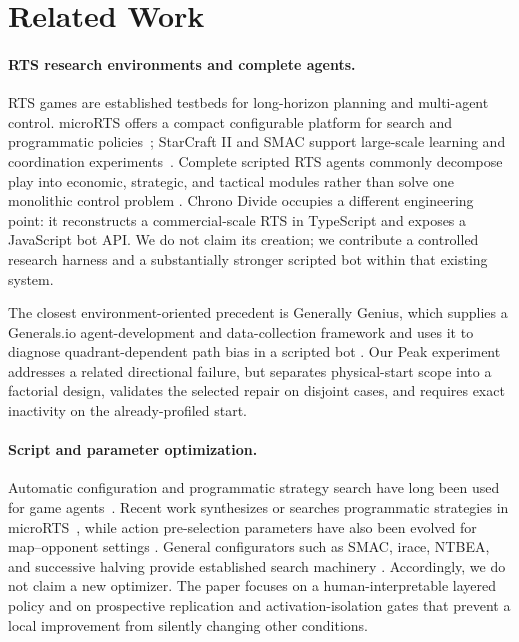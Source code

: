 \section{Related Work}
\label{sec:related}

\paragraph{RTS research environments and complete agents.}
RTS games are established testbeds for long-horizon planning and multi-agent
control. microRTS offers a compact configurable platform for search and
programmatic policies~\cite{ontanon2018microrts,marino2021programmatic};
StarCraft II and SMAC support large-scale learning and coordination
experiments~\cite{vinyals2017sc2le,samvelyan2019smac}. Complete scripted RTS
agents commonly decompose play into economic, strategic, and tactical modules
rather than solve one monolithic control problem
\cite{young2012goal,othman2012starcraft}. Chrono Divide occupies a different
engineering point: it reconstructs a commercial-scale RTS in TypeScript and
exposes a JavaScript bot API\@. We do not claim its creation; we contribute a
controlled research harness and a substantially stronger scripted bot within
that existing system.

The closest environment-oriented precedent is Generally Genius, which supplies
a Generals.io agent-development and data-collection framework and uses it to
diagnose quadrant-dependent path bias in a scripted bot
\cite{bhatia2023generally}. Our Peak experiment addresses a related directional
failure, but separates physical-start scope into a factorial design, validates
the selected repair on disjoint cases, and requires exact inactivity on the
already-profiled start.

\paragraph{Script and parameter optimization.}
Automatic configuration and programmatic strategy search have long been used
for game agents~\cite{fernandezAres2011optimizing,mora2012noisy,%
fernandezAres2012map}. Recent work synthesizes or searches programmatic
strategies in microRTS~\cite{marino2021programmatic,medeiros2022sketches,%
aleixo2023bilevel,moraes2023opponents,moraes2024semantic}, while action
pre-selection parameters have also been evolved for map--opponent settings
\cite{ouessai2022evolving}. General configurators such as SMAC, irace, NTBEA,
and successive halving provide established search machinery
\cite{hutter2011smac,lopezIbanez2016irace,lucas2018ntbea,li2018hyperband}.
Accordingly, we do not claim a new optimizer. The paper focuses on a
human-interpretable layered policy and on prospective replication and
activation-isolation gates that prevent a local improvement from silently
changing other conditions.

